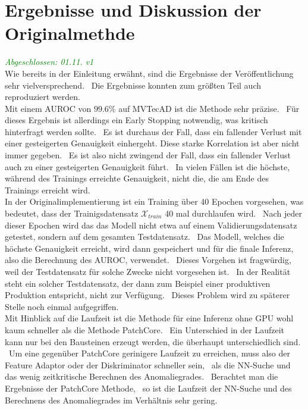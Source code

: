 \section{Ergebnisse und Diskussion der Originalmethde}\label{sec:SimpleNet-ErgebnisseUndDiskussion}
\textcolor{green}{\textit{Abgeschlossen: 01.11. v1}}\\
Wie bereits in der Einleitung erwähnt, sind die Ergebnisse der Veröffentlichung sehr vielversprechend. \
Die Ergebnisse konnten zum größten Teil auch reproduziert werden. \\
Mit einem AUROC von $\num{99,6}$\% auf MVTecAD ist die Methode sehr präzise. \
Für dieses Ergebnis ist allerdings ein \glqq Early Stopping\grqq{} notwendig, was kritisch hinterfragt werden sollte. \
Es ist durchaus der Fall, dass ein fallender Verlust mit einer gesteigerten Genauigkeit einhergeht. Diese starke Korrelation ist aber nicht immer gegeben. \
Es ist also nicht zwingend der Fall, dass ein fallender Verlust auch zu einer gesteigerten Genauigkeit führt. \ 
In vielen Fällen ist die höchste, während des Trainings erreichte Genauigkeit, nicht die, die am Ende des Trainings erreicht wird. \\
In der Originalimplementierung ist ein Training über 40 Epochen vorgesehen, was bedeutet, dass der Trainigsdatensatz $\mathcal{X}_{train}$ 40 mal durchlaufen wird. \
Nach jeder dieser Epochen wird das das Modell nicht etwa auf einem Validierungsdatensatz getestet, sondern auf dem gesamten Testdatensatz. \
Das Modell, welches die höchste Genauigkeit erreicht, wird dann gespeichert und für die finale Inferenz, also die Berechnung des AUROC, verwendet. \
Dieses Vorgehen ist fragwürdig, weil der Testdatensatz für solche Zwecke nicht vorgesehen ist. \
In der Realität steht ein solcher Testdatensatz, der dann zum Beispiel einer produktiven Produktion entspricht, nicht zur Verfügung. \
Dieses Problem wird zu späterer Stelle noch einmal aufgegriffen. \\
Mit Hinblick auf die Laufzeit ist die Methode für eine Inferenz ohne GPU wohl kaum schneller als die Methode PatchCore. \
Ein Unterschied in der Laufzeit kann nur bei den Bausteinen erzeugt werden, die überhaupt unterschiedlich sind. \
Um eine gegenüber PatchCore gerinigere Laufzeit zu erreichen, muss also der Feature Adaptor oder der Diskriminator schneller sein, \
als die NN-Suche und das wenig zeitkritische Berechnen des Anomaliegrades. \ Berachtet man die Ergebnisse der PatchCore Methode, \
so ist die Laufzeit der NN-Suche und des Berechnens des Anomaliegrades im Verhältnis sehr gering. \
